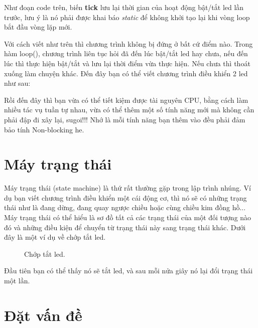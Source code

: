 Như đoạn code trên, biến \textbf{tick} lưu lại thời gian của hoạt động bật/tắt led lần trước, lưu ý là nó phải được khai báo \textit{static} để không khởi tạo lại khi vòng loop bắt đầu vòng lặp mới.

Với cách viết như trên thì chương trình không bị đứng ở bất cứ điểm nào. Trong hàm loop(), chương trình liên tục hỏi đã đến lúc bật/tắt led hay chưa, nếu đến lúc thì thực hiện bật/tắt và lưu lại thời điểm vừa thực hiện. Nếu chưa thì thoát xuống làm chuyện khác. Đến đây bạn có thể viết chương trình điều khiển 2 led như sau:


Rồi đến đây thì bạn vừa có thể tiết kiệm được tài nguyên CPU, bằng cách làm nhiều tác vụ tuần tự nhau, vừa có thể thêm một số tính năng mới mà không cần phải đập đi xây lại, sugoi!!! Nhớ là mỗi tính năng bạn thêm vào đều phải đảm bảo tính Non-blocking he.
\section{Máy trạng thái}

Máy trạng thái (state machine) là thứ rất thường gặp trong lập trình nhúng. Ví dụ bạn viết chương trình điều khiển một cái động cơ, thì nó sẽ có những trạng thái như là đang dừng, đang quay ngược chiều hoặc cùng chiều kim đồng hồ... Máy trạng thái có thể hiểu là sơ đồ tất cả các trạng thái của một đối tượng nào đó và những điều kiện để chuyển từ trạng thái này sang trạng thái khác. Dưới đây là một ví dụ về chớp tắt led.
\begin{figure}[h!]
	\centering
{}
\caption{Chớp tắt led.}
\end{figure}

Đầu tiên bạn có thể thấy nó sẽ tắt led, và sau mỗi nửa giây nó lại đổi trạng thái một lần.

\section{Đặt vấn đề}

